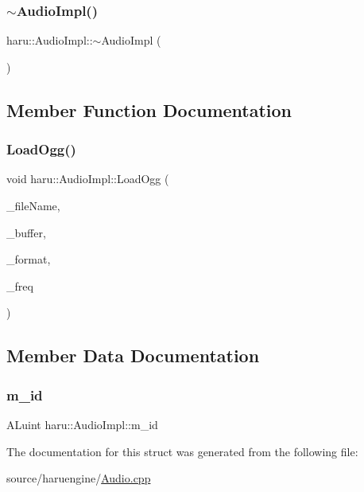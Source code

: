 \subsubsection{\texorpdfstring{$\sim$\+Audio\+Impl()}{~AudioImpl()}}
{\footnotesize\ttfamily haru\+::\+Audio\+Impl\+::$\sim$\+Audio\+Impl (\begin{DoxyParamCaption}{ }\end{DoxyParamCaption})\hspace{0.3cm}{\ttfamily [inline]}}



\subsection{Member Function Documentation}
\mbox{\label{structharu_1_1_audio_impl_a1bbcc60ff37aaf0e222210b82185a370}} 
\subsubsection{\texorpdfstring{Load\+Ogg()}{LoadOgg()}}
{\footnotesize\ttfamily void haru\+::\+Audio\+Impl\+::\+Load\+Ogg (\begin{DoxyParamCaption}\item[{std\+::string}]{\+\_\+file\+Name,  }\item[{std\+::vector$<$ char $>$ \&}]{\+\_\+buffer,  }\item[{A\+Lenum \&}]{\+\_\+format,  }\item[{A\+Lsizei \&}]{\+\_\+freq }\end{DoxyParamCaption})\hspace{0.3cm}{\ttfamily [inline]}}



\subsection{Member Data Documentation}
\mbox{\label{structharu_1_1_audio_impl_ac8e1bde9361d817cc1676c309cf6541a}} 
\subsubsection{\texorpdfstring{m\+\_\+id}{m\_id}}
{\footnotesize\ttfamily A\+Luint haru\+::\+Audio\+Impl\+::m\+\_\+id}



The documentation for this struct was generated from the following file\+:\begin{DoxyCompactItemize}
\item 
source/haruengine/\mbox{\hyperlink{_audio_8cpp}{Audio.\+cpp}}\end{DoxyCompactItemize}
